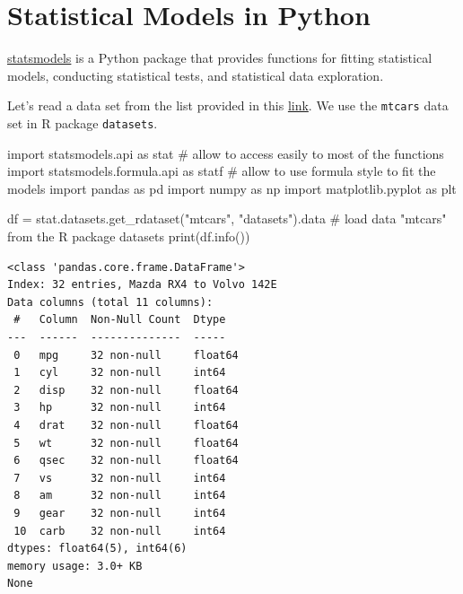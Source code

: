 \documentclass[
  letterpaper,
  DIV=11,
  numbers=noendperiod]{scrreprt}
\newenvironment{Shaded}{\begin{snugshade}}{\end{snugshade}}
\newcommand{\BuiltInTok}[1]{\textcolor[rgb]{0.00,0.23,0.31}{#1}}
\newcommand{\CommentTok}[1]{\textcolor[rgb]{0.37,0.37,0.37}{#1}}
\newcommand{\ImportTok}[1]{\textcolor[rgb]{0.00,0.46,0.62}{#1}}
\newcommand{\NormalTok}[1]{\textcolor[rgb]{0.00,0.23,0.31}{#1}}
\newcommand{\OperatorTok}[1]{\textcolor[rgb]{0.37,0.37,0.37}{#1}}
\newcommand{\StringTok}[1]{\textcolor[rgb]{0.13,0.47,0.30}{#1}}
\begin{document}
\hypertarget{statistical-models-in-python}{%
\section*{Statistical Models in
Python}\label{statistical-models-in-python}}


\href{https://www.statsmodels.org/stable/index.html}{statsmodels} is a
Python package that provides functions for fitting statistical models,
conducting statistical tests, and statistical data exploration.

Let's read a data set from the list provided in this
\href{https://github.com/vincentarelbundock/Rdatasets/}{link}. We use
the \texttt{mtcars} data set in R package \texttt{datasets}.

\begin{Shaded}
\begin{Highlighting}[]
\ImportTok{import}\NormalTok{ statsmodels.api }\ImportTok{as}\NormalTok{ stat }\CommentTok{\# allow to access easily to most of the functions}
\ImportTok{import}\NormalTok{ statsmodels.formula.api }\ImportTok{as}\NormalTok{ statf }\CommentTok{\# allow to use formula style to fit the models}
\ImportTok{import}\NormalTok{ pandas }\ImportTok{as}\NormalTok{ pd}
\ImportTok{import}\NormalTok{ numpy }\ImportTok{as}\NormalTok{ np}
\ImportTok{import}\NormalTok{ matplotlib.pyplot }\ImportTok{as}\NormalTok{ plt}

\NormalTok{df }\OperatorTok{=}\NormalTok{ stat.datasets.get\_rdataset(}\StringTok{"mtcars"}\NormalTok{, }\StringTok{"datasets"}\NormalTok{).data }\CommentTok{\# load data "mtcars" from the R package \textquotesingle{}datasets\textquotesingle{}}
\BuiltInTok{print}\NormalTok{(df.info())}
\end{Highlighting}
\end{Shaded}

\begin{verbatim}
<class 'pandas.core.frame.DataFrame'>
Index: 32 entries, Mazda RX4 to Volvo 142E
Data columns (total 11 columns):
 #   Column  Non-Null Count  Dtype  
---  ------  --------------  -----  
 0   mpg     32 non-null     float64
 1   cyl     32 non-null     int64  
 2   disp    32 non-null     float64
 3   hp      32 non-null     int64  
 4   drat    32 non-null     float64
 5   wt      32 non-null     float64
 6   qsec    32 non-null     float64
 7   vs      32 non-null     int64  
 8   am      32 non-null     int64  
 9   gear    32 non-null     int64  
 10  carb    32 non-null     int64  
dtypes: float64(5), int64(6)
memory usage: 3.0+ KB
None
\end{verbatim}
\end{document}
